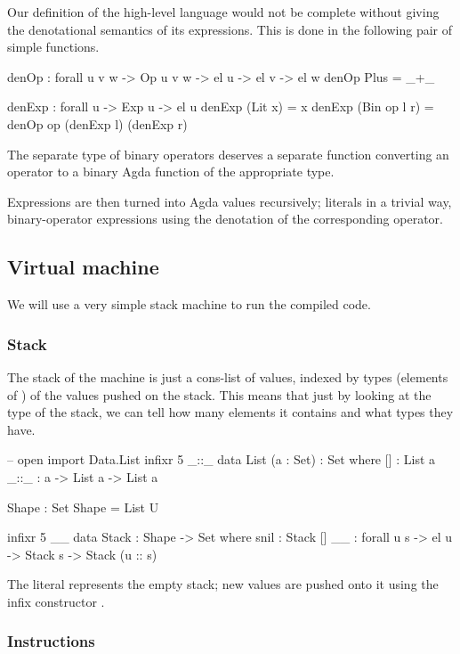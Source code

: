 Our definition of the high-level language would not be complete without giving
the denotational semantics of its expressions. This is done in the following
pair of simple functions.

\begin{code}
  denOp : forall {u v w} -> Op u v w -> el u -> el v -> el w
  denOp Plus = _+_

  denExp : forall {u} -> Exp u -> el u
  denExp (Lit x) = x
  denExp (Bin op l r) = denOp op (denExp l) (denExp r)
\end{code}

\noindent The separate type of binary operators deserves a separate function
converting an operator to a binary Agda function of the appropriate type.

Expressions are then turned into Agda values recursively; literals in a trivial
way, binary-operator expressions using the denotation of the corresponding
operator.

\subsection{Virtual machine}

We will use a very simple stack machine to run the compiled code.

\subsubsection{Stack}

The stack of
the machine is just a cons-list of values, indexed by types (elements of
) of the values pushed on the stack.  This means that just by looking
at the type of the stack, we can tell how many elements it contains and what
types they have.
\begin{code}
  -- open import Data.List
  infixr 5 _::_
  data List (a : Set) : Set where
    [] : List a
    _::_ : a -> List a -> List a

  Shape : Set
  Shape = List U

  infixr 5 _\scons_
  data Stack : Shape -> Set where
    snil : Stack []
    _\scons_ : forall {u s} -> el u -> Stack s -> Stack (u :: s)
\end{code}
\noindent The literal  represents the empty stack; new values are
pushed onto it using the infix constructor \ident{\_\scons\_}.

\subsubsection{Instructions}

